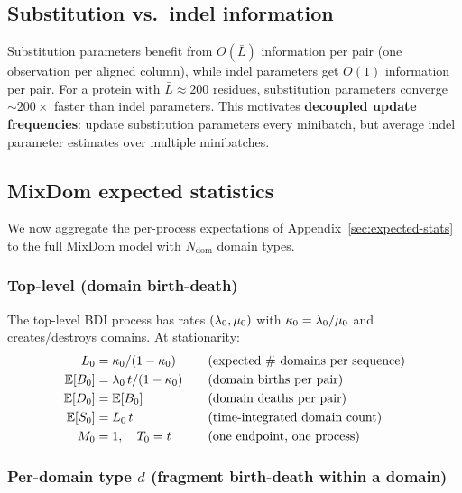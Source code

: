 \subsection{Substitution vs.\ indel information}
\label{sec:svb-mixdom-subst-vs-indel}

Substitution parameters benefit from $O(\bar L)$ information per pair
(one observation per aligned column), while indel parameters get $O(1)$
information per pair.
For a protein with $\bar L \approx 200$ residues, substitution parameters
converge $\sim 200\times$ faster than indel parameters.
This motivates \textbf{decoupled update frequencies}: update substitution
parameters every minibatch, but average indel parameter estimates over
multiple minibatches.

\subsection{MixDom expected statistics}
\label{sec:svb-mixdom-expected-stats}

We now aggregate the per-process expectations of
Appendix~\ref{sec:expected-stats} to the full MixDom model
with $N_{\text{dom}}$ domain types.

\subsubsection{Top-level (domain birth-death)}

The top-level BDI process has rates $(\lambda_0, \mu_0)$ with
$\kappa_0 = \lambda_0/\mu_0$ and creates/destroys domains.
At stationarity:
\begin{alignat}{2}
L_0 &= \kappa_0/(1-\kappa_0)
  &\quad& \text{(expected \# domains per sequence)}
\label{eq:L0}
\\
\mathbb{E}[B_0] &= \lambda_0\,t/(1-\kappa_0)
  &\quad& \text{(domain births per pair)}
\label{eq:EB0}
\\
\mathbb{E}[D_0] &= \mathbb{E}[B_0]
  &\quad& \text{(domain deaths per pair)}
\label{eq:ED0}
\\
\mathbb{E}[S_0] &= L_0\,t
  &\quad& \text{(time-integrated domain count)}
\label{eq:ES0}
\\
M_0 &= 1, \quad T_0 = t
  &\quad& \text{(one endpoint, one process)}
\label{eq:M0T0}
\end{alignat}

\subsubsection{\texorpdfstring{Per-domain type $d$ (fragment birth-death within a domain)}{Per-domain type d (fragment birth-death within a domain)}}

